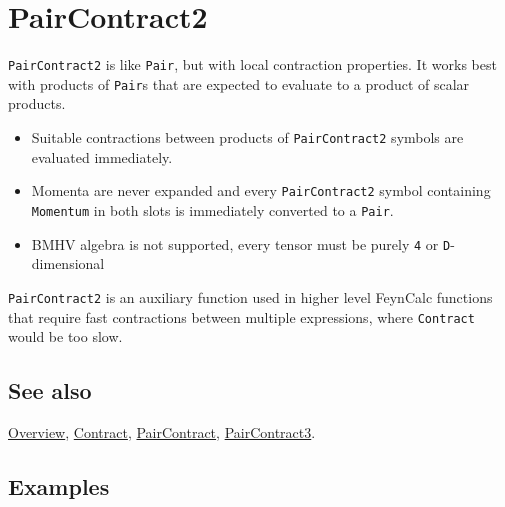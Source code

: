 \documentclass[../FeynCalcManual.tex]{subfiles}
\begin{document}
\hypertarget{paircontract2}{
\section{PairContract2}\label{paircontract2}}

\texttt{PairContract2} is like \texttt{Pair}, but with local contraction
properties. It works best with products of \texttt{Pair}s that are
expected to evaluate to a product of scalar products.

\begin{itemize}
\tightlist
\item
  Suitable contractions between products of \texttt{PairContract2}
  symbols are evaluated immediately.
\item
  Momenta are never expanded and every \texttt{PairContract2} symbol
  containing \texttt{Momentum} in both slots is immediately converted to
  a \texttt{Pair}.
\item
  BMHV algebra is not supported, every tensor must be purely \texttt{4}
  or \texttt{D}-dimensional
\end{itemize}

\texttt{PairContract2} is an auxiliary function used in higher level
FeynCalc functions that require fast contractions between multiple
expressions, where \texttt{Contract} would be too slow.

\subsection{See also}

\hyperlink{toc}{Overview}, \hyperlink{contract}{Contract},
\hyperlink{paircontract}{PairContract},
\hyperlink{paircontract3}{PairContract3}.

\subsection{Examples}

\begin{Shaded}
\begin{Highlighting}[]
\OperatorTok{[}\OperatorTok{[}\SpecialCharTok{\textbackslash{}}\OperatorTok{[}\OperatorTok{]],}\OperatorTok{[}\OperatorTok{]]}\OperatorTok{[}\OperatorTok{[}\SpecialCharTok{\textbackslash{}}\OperatorTok{[}\OperatorTok{]],}\OperatorTok{[}\OperatorTok{]]} 
 
\SpecialCharTok{\%} \OtherTok{{-}\textgreater{}}
\end{Highlighting}
\end{Shaded}
\end{document}
